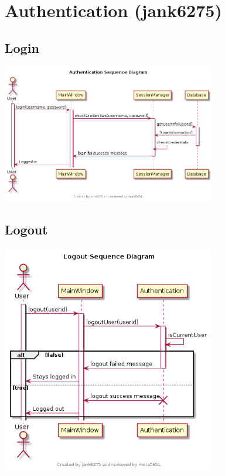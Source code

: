 \documentclass[11pt]{report}
\begin{document}
\section{Authentication (jank6275)}
    \subsection{Login}
        \begin{minipage}{1\textwidth}
            \begin{center}
                \includegraphics[width=0.7\textwidth]{diagrams/sequence-authentication-login}
            \end{center}
        \end{minipage}
    \subsection{Logout}
        \begin{minipage}{1\textwidth}
            \begin{center}
                \includegraphics[width=0.7\textwidth]{diagrams/sequence-authentication-logout}
            \end{center}
        \end{minipage}
\end{document}
